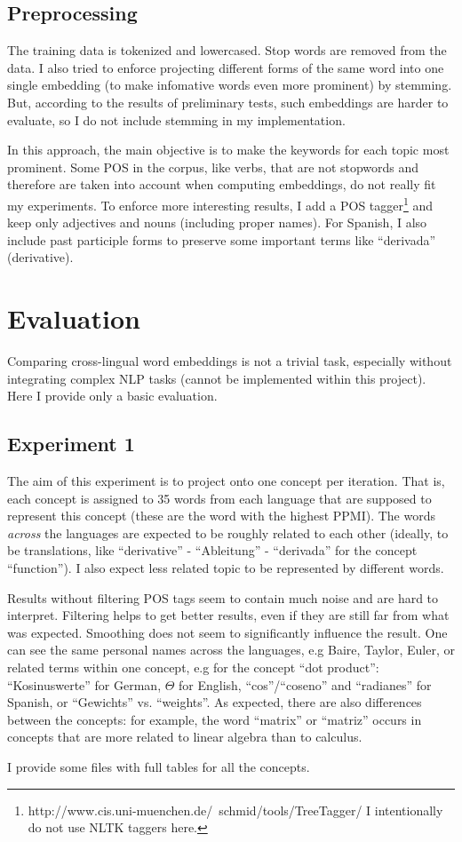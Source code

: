 \documentclass[a4paper]{article}
\begin{document}
\subsection{Preprocessing} 
The training data is tokenized and lowercased. Stop words are removed from the data. I also tried to enforce projecting different forms of the same word into one single embedding (to make infomative words even more prominent) by stemming. But, according to the results of preliminary tests, such embeddings are harder to evaluate, so I do not include stemming in my implementation. \par
In this approach, the main objective is to make the keywords for each topic most prominent. Some POS in the corpus, like verbs, that are not stopwords and therefore are taken into account when computing embeddings, do not really fit my experiments. To enforce more interesting results, I add a POS tagger\footnote{http://www.cis.uni-muenchen.de/~schmid/tools/TreeTagger/ I intentionally do not use NLTK taggers here.} and keep only adjectives and nouns (including proper names). For Spanish, I also include past participle forms to preserve some important terms like ``derivada'' (derivative).
\section{Evaluation}
Comparing cross-lingual word embeddings is not a trivial task, especially without integrating complex NLP tasks (cannot be implemented within this project). Here I provide only a basic evaluation.
\subsection{Experiment 1}
The aim of this experiment is to project onto one concept per iteration. That is, each concept is assigned to 35 words from each language that are supposed to represent this concept (these are the word with the highest PPMI). The words \textit{across} the languages are expected to be roughly related to each other (ideally, to be translations, like ``derivative'' - ``Ableitung'' - ``derivada'' for the concept ``function''). I also expect less related topic to be represented by different words.\par
Results without filtering POS tags seem to contain much noise and are hard to interpret. Filtering helps to get better results, even if they are still far from what was expected. Smoothing does not seem to significantly influence the result. One can see the same personal names across the languages, e.g Baire, Taylor, Euler, or related terms within one concept, e.g for the concept ``dot product'': ``Kosinuswerte'' for German, $\Theta$ for English, ``cos''/``coseno'' and ``radianes'' for Spanish, or ``Gewichts'' vs. ``weights''. As expected, there are also differences between the concepts: for example, the word ``matrix'' or ``matriz'' occurs in concepts that are more related to linear algebra than to calculus. \par
I provide some files with full tables for all the concepts.
\end{document}
